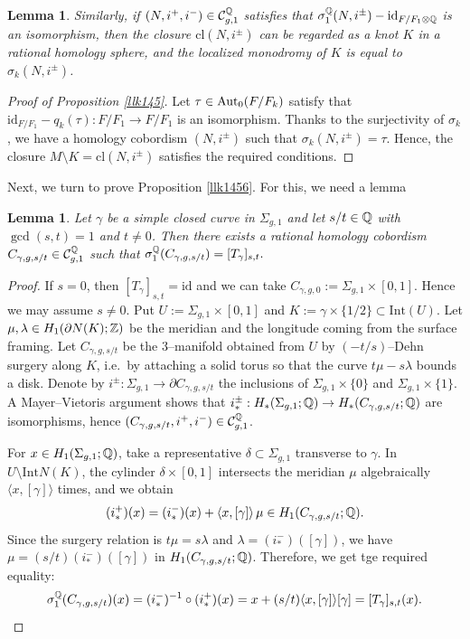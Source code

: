 \documentclass{article}
\theoremstyle{plain}
\newtheorem{lem}[thm]{Lemma}
\theoremstyle{definition}
\newcommand{\ra}{\rightarrow}
\newcommand{\Q}{{\Bbb Q}}
\newcommand{\Z}{{\Bbb Z}}
\newcommand{\Aut}{{\rm Aut}}
\begin{document}
{\begin{lem}
Similarly, if $(N, i^+, i^- ) \in \mathcal{C}_{g,1}^\Q$ satisfies that
$ \sigma_1^{\Q} (N, i^{\pm}) - \mathrm{id}_{F/F_1 \otimes \Q}$ is an isomorphism,
then the closure $ \mathrm{cl}(N,i^{\pm} )$ can be regarded as a knot $K$ in a rational homology sphere, and the localized monodromy of $K$ is equal to $ \sigma_k (N, i^{\pm}) $.
\end{lem}
\begin{proof}[Proof of Proposition \ref{llk145}]
Let $\tau \in \Aut_0 (F/F_k)$ satisfy that
$ \mathrm{id}_{F/F_1}- q_k ( \tau) : F/F_1\ra F/F_1$ is an isomorphism.
Thanks to the surjectivity of $\sigma_k$, we have a homology cobordism $(N, i^{\pm})$ such that
$ \sigma_k (N, i^{\pm}) = \tau$. Hence, the closure $M \setminus K = \mathrm{cl}(N,i^{\pm} )$
satisfies the required conditions.
\end{proof}
Next, we turn to prove Proposition \ref{llk1456}.
For this, we need a lemma%
\begin{lem}\label{lem:transvection_cobordism}
Let $\gamma$ be a simple closed curve in $\Sigma_{g,1}$ and let $s/t\in\Q$ with $\gcd(s,t)=1$ and $t\neq 0$.
Then there exists a rational homology cobordism $C_{\gamma,g,s/t}\in\mathcal{C}_{g,1}^{\Q}$ such that
$
\sigma_1^{\Q}(C_{\gamma,g,s/t})=[T_{\gamma}]_{s,t}.
$
\end{lem}
\begin{proof}
If $s=0$, then $[T_{\gamma}]_{s,t}=\mathrm{id}$ and we can take $C_{\gamma,g,0}:=\Sigma_{g,1}\times[0,1]$.
Hence we may assume $s\neq 0$.
Put $U:=\Sigma_{g,1}\times[0,1]$ and $K:=\gamma\times\{1/2\}\subset \mathrm{Int}(U)$.
Let $\mu,\lambda\in H_1(\partial N(K);\Z)$ be the meridian and the longitude coming from the surface framing.
Let $C_{\gamma,g,s/t}$ be the $3$--manifold obtained from $U$ by $(-t/s)$--Dehn surgery along $K$,
i.e.\ by attaching a solid torus so that the curve $t\mu-s\lambda$ bounds a disk.
Denote by $i^\pm:\Sigma_{g,1}\to \partial C_{\gamma,g,s/t}$ the inclusions of $\Sigma_{g,1}\times\{0\}$ and $\Sigma_{g,1}\times\{1\}$.
A Mayer--Vietoris argument shows that $i^\pm_*:H_*(\Sigma_{g,1};\Q)\to H_*(C_{\gamma,g,s/t};\Q)$ are isomorphisms, hence
$(C_{\gamma,g,s/t},i^+,i^-)\in \mathcal{C}_{g,1}^{\Q}$.

For $x\in H_1(\Sigma_{g,1};\Q)$, take a representative $\delta\subset \Sigma_{g,1}$ transverse to $\gamma$.
In $U\setminus \mathrm{Int}N(K)$, the cylinder $\delta\times[0,1]$ intersects the meridian $\mu$ algebraically $\langle x,[\gamma]\rangle$ times, and we obtain
\[
(i^+_*)(x)=(i^-_*)(x)+\langle x,[\gamma]\rangle\,\mu\in H_1(C_{\gamma,g,s/t};\Q).
\]
Since the surgery relation is $t\mu=s\lambda$ and $\lambda=(i^-_*)([\gamma])$, we have $\mu=(s/t)(i^-_*)([\gamma])$ in $H_1(C_{\gamma,g,s/t};\Q)$.
Therefore, we get tge required equality:
\[
\sigma_1^{\Q}(C_{\gamma,g,s/t})(x)=(i^-_*)^{-1}\circ(i^+_*)(x)
=x+(s/t)\langle x,[\gamma]\rangle[\gamma]=[T_{\gamma}]_{s,t}(x).
\]


\end{proof}}
\end{document}
